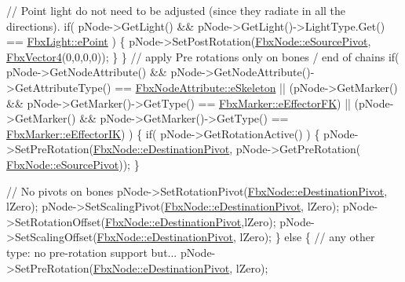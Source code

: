 \begin{DoxyCode}
   \textcolor{comment}{// Point light do not need to be adjusted (since they radiate in all the directions).}
   \textcolor{keywordflow}{if}( pNode->GetLight() && pNode->GetLight()->LightType.Get() == 
      \hyperlink{class_fbx_light_ace4ba495501bddf1341600bea7ed8dafaf011f303cca315a722180e2be1764bed}{FbxLight::ePoint} )
   \{
       pNode->SetPostRotation(\hyperlink{class_fbx_node_ae62b7311ac4727654cdf1ebd5cbf7343ae8ed37a5c7e41f8d1cec9d3fa8424b69}{FbxNode::eSourcePivot}, 
      \hyperlink{class_fbx_vector4}{FbxVector4}(0,0,0,0));
   \}
\}
\textcolor{comment}{// apply Pre rotations only on bones / end of chains}
\textcolor{keywordflow}{if}( pNode->GetNodeAttribute() && pNode->GetNodeAttribute()->GetAttributeType() == 
      \hyperlink{class_fbx_node_attribute_a08e1669d3d1a696910756ab17de56d6aa96d656ce797a857ae3f5e16ceb7bc43a}{FbxNodeAttribute::eSkeleton}
   || (pNode->GetMarker() && pNode->GetMarker()->GetType() == 
      \hyperlink{class_fbx_marker_ad1e38753dce9a2212df0364466d9f617adc5085898df38077b0bddb3367fb7bb3}{FbxMarker::eEffectorFK})
   || (pNode->GetMarker() && pNode->GetMarker()->GetType() == 
      \hyperlink{class_fbx_marker_ad1e38753dce9a2212df0364466d9f617a6eb5815d51c3fd66217211a2a4e70538}{FbxMarker::eEffectorIK}) )
\{
   \textcolor{keywordflow}{if}( pNode->GetRotationActive() )
   \{
      pNode->SetPreRotation(\hyperlink{class_fbx_node_ae62b7311ac4727654cdf1ebd5cbf7343a9822ce03ebfd64b85ca6a570201eb3cc}{FbxNode::eDestinationPivot}, pNode->GetPreRotation(
      \hyperlink{class_fbx_node_ae62b7311ac4727654cdf1ebd5cbf7343ae8ed37a5c7e41f8d1cec9d3fa8424b69}{FbxNode::eSourcePivot}));
   \}
                    
   \textcolor{comment}{// No pivots on bones}
   pNode->SetRotationPivot(\hyperlink{class_fbx_node_ae62b7311ac4727654cdf1ebd5cbf7343a9822ce03ebfd64b85ca6a570201eb3cc}{FbxNode::eDestinationPivot}, lZero);    
   pNode->SetScalingPivot(\hyperlink{class_fbx_node_ae62b7311ac4727654cdf1ebd5cbf7343a9822ce03ebfd64b85ca6a570201eb3cc}{FbxNode::eDestinationPivot}, lZero);    
   pNode->SetRotationOffset(\hyperlink{class_fbx_node_ae62b7311ac4727654cdf1ebd5cbf7343a9822ce03ebfd64b85ca6a570201eb3cc}{FbxNode::eDestinationPivot},lZero);    
   pNode->SetScalingOffset(\hyperlink{class_fbx_node_ae62b7311ac4727654cdf1ebd5cbf7343a9822ce03ebfd64b85ca6a570201eb3cc}{FbxNode::eDestinationPivot}, lZero);
\}
\textcolor{keywordflow}{else}
\{
   \textcolor{comment}{// any other type: no pre-rotation support but...}
   pNode->SetPreRotation(\hyperlink{class_fbx_node_ae62b7311ac4727654cdf1ebd5cbf7343a9822ce03ebfd64b85ca6a570201eb3cc}{FbxNode::eDestinationPivot}, lZero);
      

\end{DoxyCode}
